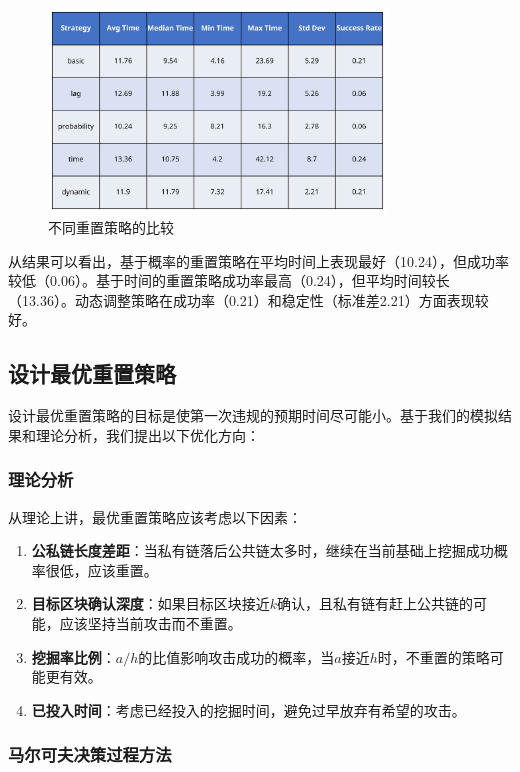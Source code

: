 \documentclass[12pt,a4paper]{article}
\begin{document}
\begin{CJK}{UTF8}{gbsn}
\begin{figure}[h]
    \centering
    \includegraphics[width=0.8\textwidth]{images/reset_strategy_table.png}
    \caption{不同重置策略的比较}
\end{figure}

从结果可以看出，基于概率的重置策略在平均时间上表现最好（10.24），但成功率较低（0.06）。基于时间的重置策略成功率最高（0.24），但平均时间较长（13.36）。动态调整策略在成功率（0.21）和稳定性（标准差2.21）方面表现较好。

\subsection{设计最优重置策略}

设计最优重置策略的目标是使第一次违规的预期时间尽可能小。基于我们的模拟结果和理论分析，我们提出以下优化方向：

\subsubsection{理论分析}

从理论上讲，最优重置策略应该考虑以下因素：

\begin{enumerate}
    \item \textbf{公私链长度差距}：当私有链落后公共链太多时，继续在当前基础上挖掘成功概率很低，应该重置。
    \item \textbf{目标区块确认深度}：如果目标区块接近$k$确认，且私有链有赶上公共链的可能，应该坚持当前攻击而不重置。
    \item \textbf{挖掘率比例}：$a/h$的比值影响攻击成功的概率，当$a$接近$h$时，不重置的策略可能更有效。
    \item \textbf{已投入时间}：考虑已经投入的挖掘时间，避免过早放弃有希望的攻击。
\end{enumerate}

\subsubsection{马尔可夫决策过程方法}


\end{CJK}
\end{document}
